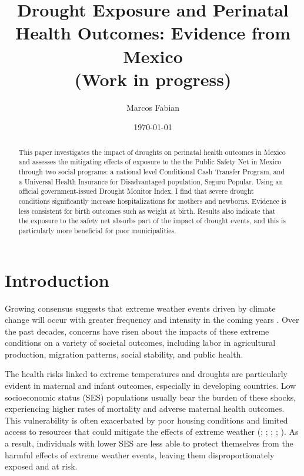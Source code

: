 \documentclass[12pt, oneside]{article}      %
\title{{Drought Exposure and Perinatal Health Outcomes: Evidence from Mexico} \vspace{1cm} \\ \large{(Work in progress)}}
\author{Marcos Fabian}
\date{\today}
\begin{document}
\maketitle



\begin{abstract}

This paper investigates the impact of droughts on perinatal health outcomes in Mexico and assesses the mitigating effects of exposure to the the Public Safety Net in Mexico through two social programs: a national level Conditional Cash Transfer Program, and a Universal Health Insurance for Disadvantaged population, Seguro Popular. Using an official government-issued Drought Monitor Index, I find that severe drought conditions significantly increase hospitalizations for mothers and newborns. Evidence is less consistent for birth outcomes such as weight at birth. Results also indicate that the exposure to the safety net absorbs part of the impact of drought events, and this is particularly more beneficial for poor municipalities.


\end{abstract}

\clearpage
\newpage



\section{Introduction}


Growing consensus suggests that extreme weather events driven by climate change will occur with greater frequency and intensity in the coming years \cite{Calvin2023}. Over the past decades, concerns have risen about the impacts of these extreme conditions on a variety of societal outcomes, including labor in agricultural production, migration patterns, social stability, and public health.

The health risks linked to extreme temperatures and droughts are particularly evident in maternal and infant outcomes, especially in developing countries. Low socioeconomic status (SES) populations usually bear the burden of these shocks, experiencing higher rates of mortality and adverse maternal health outcomes. This vulnerability is often exacerbated by poor housing conditions and limited access to resources that could mitigate the effects of extreme weather (\cite{Gouveia2003}; \cite{Skoufias2012}; \cite{Gasparrini2015}; \cite{Cohen2022}; \cite{Chen2020}). As a result, individuals with lower SES are less able to protect themselves from the harmful effects of extreme weather events, leaving them disproportionately exposed and at risk.
\end{document}
